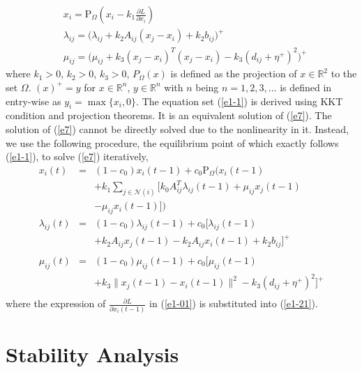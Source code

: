 \documentclass[journal]{IEEEtran}
\begin{document}
\begin{subequations}\label{e1-1}
\begin{align}
&x_i=\text{P}_{\Omega}(x_i-k_1\frac{\partial L}{\partial x_i})\\
&\lambda_{ij}=\big(\lambda_{ij}+k_2A_{ij}(x_j-x_i)+k_2b_{ij}\big)^+ \\
&\mu_{ij}=\big(\mu_{ij}+k_3(x_j-x_i)^T(x_j-x_i)-k_3(d_{ij}+\eta^+)^2\big)^+
\end{align}
\end{subequations}
where $k_1>0$, $k_2>0$, $k_3>0$, $P_\Omega(x)$ is defined as the projection of $x\in\mathbb{R}^2$ to the set $\Omega$. $(x)^+=y$ for $x\in\mathbb{R}^n$, $y\in\mathbb{R}^n$ with $n$ being $n=1,2,3,...$ is defined in entry-wise as $y_i=\max\{x_i, 0\}$. The equation set (\ref{e1-1}) is derived using KKT condition and projection theorems. It is an equivalent solution of (\ref{e7}). The solution of (\ref{e7}) cannot be directly solved due to the nonlinearity in it. Instead, we use the following procedure, the equilibrium point of which exactly follows (\ref{e1-1}), to solve (\ref{e7}) iteratively,
\begin{subequations}\label{e1-2}
\begin{eqnarray}
x_i(t)&=&(1-c_0)x_i(t-1)+c_0\text{P}_{\Omega}\bigg(x_i(t-1)\nonumber\\
&&+k_1\sum_{j\in\mathcal{N}(i)}[k_0A^T_{ij}\lambda_{ij}(t-1)+\mu_{ij}x_j(t-1)\nonumber\\
&&-\mu_{ij}x_i(t-1)]\bigg)\label{e1-21}\\
\lambda_{ij}(t)&=&(1-c_0)\lambda_{ij}(t-1)+c_0[\lambda_{ij}(t-1)\nonumber\\ &&+k_2A_{ij}x_j(t-1)-k_2A_{ij}x_i(t-1)+k_2b_{ij}]^+ \nonumber\\
&&\,\\
\mu_{ij}(t)&=&(1-c_0)\mu_{ij}(t-1)+c_0[\mu_{ij}(t-1)\nonumber\\
&&+k_3\|x_j(t-1)-x_i(t-1)\|^2-k_3(d_{ij}+\eta^+)^2]^+\nonumber\\
&&\,
\end{eqnarray}
\end{subequations}
where the expression of $\frac{\partial L}{\partial x_i(t-1)}$ in (\ref{e1-01}) is substituted into (\ref{e1-21}).


\section{Stability Analysis}
\end{document}
